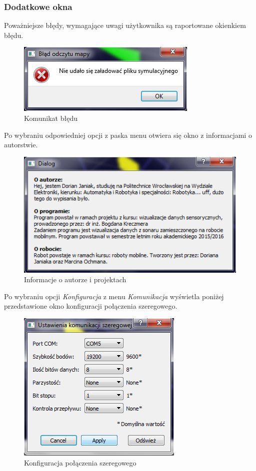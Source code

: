 \documentclass[a4paper,12pt]{article}
\begin{document}
\subsubsection{Dodatkowe okna}
Poważniejsze błędy, wymagające uwagi użytkownika są raportowane okienkiem błędu. 
\begin{figure} [H]
\centering
\includegraphics{error_screen.png}
\caption{Komunikat błędu}
\label{error_screen}
\end{figure}
Po wybraniu odpowiedniej opcji z paska menu otwiera się okno z informacjami o autorstwie.
\begin{figure} [H]
\centering
\includegraphics{app4.png}
\caption{Informacje o autorze i projektach}
\label{app4}
\end{figure}
Po wybraniu opcji \textit{Konfiguracja} z menu \textit{Komunikacja} wyświetla poniżej przedstawione okno konfiguracji połączenia szeregowego. 
\begin{figure} [H]
\centering
\includegraphics{app3.png}
\caption{Konfiguracja połączenia szeregowego}
\label{app3}
\end{figure}
\end{document}
